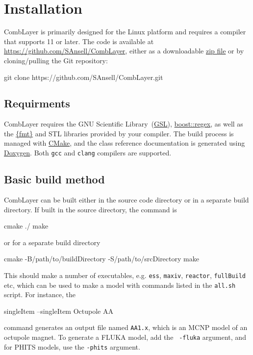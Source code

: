 \section{Installation}

CombLayer is primarily designed for the Linux platform and requires a
\CC compiler that supports {\CC}11 or later. The code is available at
\href{https://github.com/SAnsell/CombLayer}{https://github.com/SAnsell/CombLayer},
either as a downloadable
\href{https://github.com/SAnsell/CombLayer/archive/master.zip}{zip
  file} or by cloning/pulling the Git repository:
\begin{bash}
  git clone https://github.com/SAnsell/CombLayer.git
\end{bash}

\subsection{Requirments}

CombLayer requires the GNU Scientific
Library~(\href{https://www.gnu.org/software/gsl}{GSL}),
\href{https://www.boost.org}{boost::regex}, as well as the
\href{https://github.com/fmtlib/fmt}{\{fmt\}} and STL libraries
provided by your \CC compiler. The build process is managed with
\href{https://cmake.org}{CMake}, and the class reference documentation
is generated using \href{https://www.doxygen.nl}{Doxygen}.
Both {\tt gcc} and {\tt clang} compilers are supported.

\subsection{Basic build method}

CombLayer can be built either in the source code directory or in a separate build directory. If built in the source directory, the command is

\begin{bash}
  cmake ./
  make
\end{bash}

or for a separate build directory

\begin{bash}
  cmake -B/path/to/buildDirectory -S/path/to/srcDirectory
  make
\end{bash}

This should make a number of executables, e.g. {\tt ess}, {\tt maxiv},
{\tt reactor}, {\tt fullBuild} etc, which can be used to make a model
with commands listed in the {\tt all.sh} script. For instance, the
\begin{bash}
  singleItem --singleItem Octupole AA
\end{bash}
command generates an output file named {\tt AA1.x}, which is an MCNP
model of an octupole magnet. To generate a FLUKA model, add the {\tt
  -fluka} argument, and for PHITS models, use the {\tt -phits}
argument.
